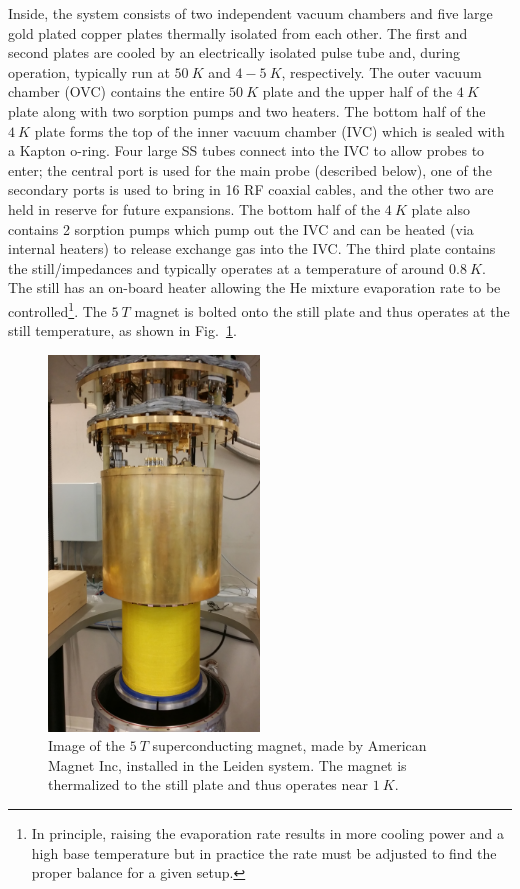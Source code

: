 Inside, the system consists of two independent vacuum chambers and five large gold plated copper plates thermally isolated from each other. The first and second plates are cooled by an electrically isolated pulse tube and, during operation, typically run at $50~K$ and $4-5~K$, respectively. The outer vacuum chamber (OVC) contains the entire $50~K$ plate and the upper half of the $4~K$ plate along with two sorption pumps and two heaters. The bottom half of the $4~K$ plate forms the top of the inner vacuum chamber (IVC) which is sealed with a Kapton o-ring. Four large SS tubes connect into the IVC to allow probes to enter; the central port is used for the main probe (described below), one of the secondary ports is used to bring in 16 RF coaxial cables, and the other two are held in reserve for future expansions. The bottom half of the $4~K$ plate also contains 2 sorption pumps which pump out the IVC and can be heated (via internal heaters) to release exchange gas into the IVC. The third plate contains the still/impedances and typically operates at a temperature of around $0.8~K$. The still has an on-board heater allowing the He mixture evaporation rate to be controlled\footnote{In principle, raising the evaporation rate results in more cooling power and a high base temperature but in practice the rate must be adjusted to find the proper balance for a given setup.}. The $5~T$ magnet is bolted onto the still plate and thus operates at the still temperature, as shown in Fig.~\ref{Fig:Appen:Leiden_magnet}.
\begin{figure}
\centering
\includegraphics[angle=-90,width = 0.5\textwidth]{figures/appendix/cryostats/Leiden_magnet.jpg}
\caption{Image of the $5~T$ superconducting magnet, made by American Magnet Inc, installed in the Leiden system. The magnet is thermalized to the still plate and thus operates near $1~K$.}
\label{Fig:Appen:Leiden_magnet}
\end{figure}

